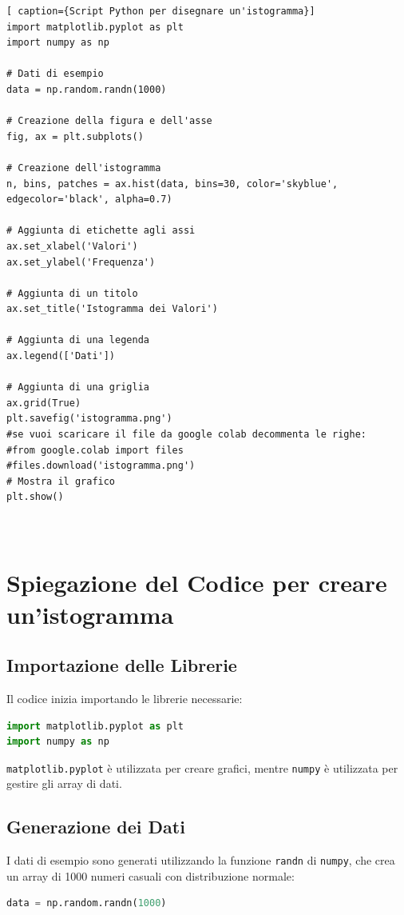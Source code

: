 \documentclass[a4paper,12pt]{article}
\begin{document}
\begin{lstlisting}[ caption={Script Python per disegnare un'istogramma}]
import matplotlib.pyplot as plt
import numpy as np

# Dati di esempio
data = np.random.randn(1000)

# Creazione della figura e dell'asse
fig, ax = plt.subplots()

# Creazione dell'istogramma
n, bins, patches = ax.hist(data, bins=30, color='skyblue', edgecolor='black', alpha=0.7)

# Aggiunta di etichette agli assi
ax.set_xlabel('Valori')
ax.set_ylabel('Frequenza')

# Aggiunta di un titolo
ax.set_title('Istogramma dei Valori')

# Aggiunta di una legenda
ax.legend(['Dati'])

# Aggiunta di una griglia
ax.grid(True)
plt.savefig('istogramma.png')
#se vuoi scaricare il file da google colab decommenta le righe:
#from google.colab import files
#files.download('istogramma.png')
# Mostra il grafico
plt.show()



\end{lstlisting}

\section{Spiegazione del Codice per creare un'istogramma}
\subsection{Importazione delle Librerie}
Il codice inizia importando le librerie necessarie:
\begin{lstlisting}[language=Python]
import matplotlib.pyplot as plt
import numpy as np
\end{lstlisting}
\texttt{matplotlib.pyplot} è utilizzata per creare grafici, mentre \texttt{numpy} è utilizzata per gestire gli array di dati.

\subsection{Generazione dei Dati}
I dati di esempio sono generati utilizzando la funzione \texttt{randn} di \texttt{numpy}, che crea un array di 1000 numeri casuali con distribuzione normale:
\begin{lstlisting}[language=Python]
data = np.random.randn(1000)
\end{lstlisting}
\end{document}
